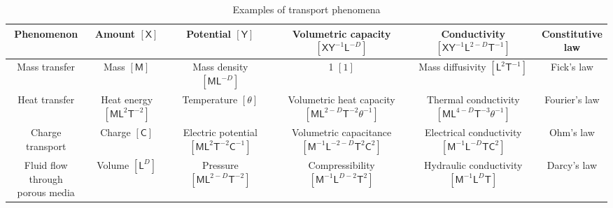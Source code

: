 \documentclass{elsarticle}
\theoremstyle{definition}
\newcommand{\amount}{\mathsf{X}}
\newcommand{\potential}{\mathsf{Y}}
\newcommand{\mass}{\mathsf{M}}
\newcommand{\length}{\mathsf{L}}
\renewcommand{\time}{\mathsf{T}}
\newcommand{\temperature}{\theta}
\newcommand{\charge}{\mathsf{C}}
\newcommand{\topStrut}{\rule{0pt}{2.6ex}}
\begin{document}
\begin{table}[!ht]
  \caption{Examples of transport phenomena}
  \label{tab:transport_phenomena}
  \centering
  \begin{tabular}{|c|c|c|c|c|c|}
    \hline
    {\bf Phenomenon}
    & \makecell{{\bf Amount} \\ $[\amount]$}
    & \makecell{{\bf Potential} \\ $[\potential]$}
    & \makecell{{\bf Volumetric capacity} \\ $[\amount \potential^{-1} \length^{-D}]$}
    & \makecell{{\bf Conductivity} \\ $[\amount \potential^{-1} \length^{2 - D} \time^{-1}]$}
    & \makecell{{\bf Constitutive} \\ {\bf law}} \topStrut \\[2pt]
    \hline
    \hline
    Mass transfer
    & \makecell{Mass \\ $[\mass]$}
    & \makecell{Mass density \\ $[\mass \length^{-D}]$}
    & \makecell{1 \\ $[1]$}
    & \makecell{Mass diffusivity \\ $[\length^2 \time^{-1}]$}
    & Fick's law \topStrut \\[2pt]
    \hline
    Heat transfer
    & \makecell{Heat energy \\ $[\mass \length^2 \time^{-2}]$}
    & \makecell{Temperature \\ $[\temperature]$}
    & \makecell{Volumetric heat capacity \\ $[\mass \length^{2 - D} \time^{-2}\temperature^{-1}]$}
    & \makecell{Thermal conductivity \\ $[\mass \length^{4 - D} \time^{-3} \temperature^{-1}]$}
    & Fourier's law \topStrut \\[2pt]
    \hline
    Charge transport
    & \makecell{Charge \\ $[\charge]$}
    & \makecell{Electric potential \\ $[\mass \length^2 \time^{-2} \charge^{-1}]$}
    & \makecell{Volumetric capacitance \\$[\mass^{-1} \length^{-2 - D} \time^2 \charge^2]$}
    & \makecell{Electrical conductivity \\ $[\mass^{-1} \length^{-D} \time \charge^2]$}
    & Ohm's law \topStrut \\[2pt]
    \hline
    \makecell{Fluid flow through \\ porous media}
    & \makecell{Volume \\ $[\length^D]$}
    & \makecell{Pressure \\ $[\mass \length^{2 - D} \time^{-2}]$}
    & \makecell{Compressibility \\ $[\mass^{-1} \length^{D - 2} \time^2]$}
    & \makecell{Hydraulic conductivity \\$[\mass^{-1} \length^D \time]$}
    & Darcy's law \topStrut \\[2pt]
    \hline
  \end{tabular}
\end{table}
\end{document}
